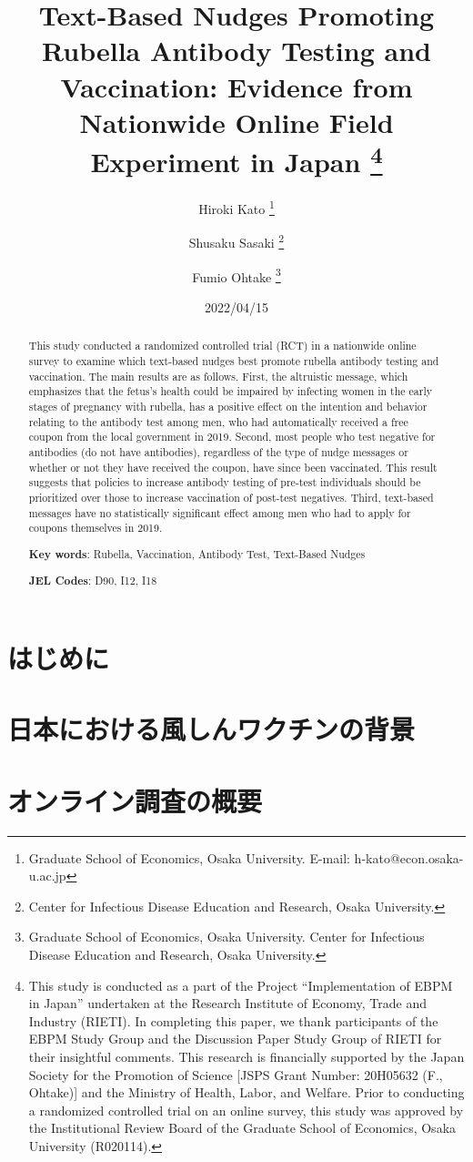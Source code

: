 \documentclass[
  11pt,
  a4paper,
]{article}
\title{Text-Based Nudges Promoting Rubella Antibody Testing and Vaccination:
Evidence from Nationwide Online Field Experiment in Japan  \thanks{This study is conducted as a part of the Project ``Implementation of EBPM in Japan''
undertaken at the Research Institute of Economy, Trade and Industry (RIETI).
In completing this paper,
we thank participants of the EBPM Study Group and
the Discussion Paper Study Group of RIETI for their insightful comments.
This research is financially supported by
the Japan Society for the Promotion of Science
{[}JSPS Grant Number: 20H05632 (F., Ohtake){]}
and the Ministry of Health, Labor, and Welfare.
Prior to conducting a randomized controlled trial on an online survey,
this study was approved by the Institutional Review Board
of the Graduate School of Economics, Osaka University (R020114).}  }
\author{
    Hiroki Kato
  \thanks{Graduate School of Economics, Osaka University. E-mail: h-kato@econ.osaka-u.ac.jp  }
  \and
    Shusaku Sasaki
  \thanks{Center for Infectious Disease Education and Research, Osaka University.  }
  \and
    Fumio Ohtake
  \thanks{Graduate School of Economics, Osaka University.
Center for Infectious Disease Education and Research, Osaka University.  }
  \and
  }
\date{2022/04/15}
\begin{document}
\begin{spacing}{1}
  \maketitle
\end{spacing}
\begin{spacing}{1}
  \begin{abstract}
    This study conducted a randomized controlled trial (RCT) in a nationwide online survey
    to examine which text-based nudges best promote rubella antibody testing and vaccination.
    The main results are as follows.
    First, the altruistic message,
    which emphasizes that the fetus's health could be impaired by
    infecting women in the early stages of pregnancy with rubella,
    has a positive effect on the intention and behavior relating to the antibody test among men,
    who had automatically received a free coupon from the local government in 2019.
    Second, most people who test negative for antibodies (do not have antibodies),
    regardless of the type of nudge messages or whether or not they have received the coupon,
    have since been vaccinated.
    This result suggests that policies to increase antibody testing of pre-test individuals
    should be prioritized over those to increase vaccination of post-test negatives.
    Third, text-based messages have no statistically significant effect
    among men who had to apply for coupons themselves in 2019.
    
                \noindent
    \textbf{Key words}: Rubella, Vaccination, Antibody Test, Text-Based Nudges
        
        \noindent
    \textbf{JEL Codes}: D90, I12, I18
            
  \end{abstract}
\end{spacing}

\hypertarget{intro}{%
\section{はじめに}\label{intro}}

\hypertarget{background}{%
\section{日本における風しんワクチンの背景}\label{background}}

\hypertarget{experiment}{%
\section{オンライン調査の概要}\label{experiment}}
\end{document}
